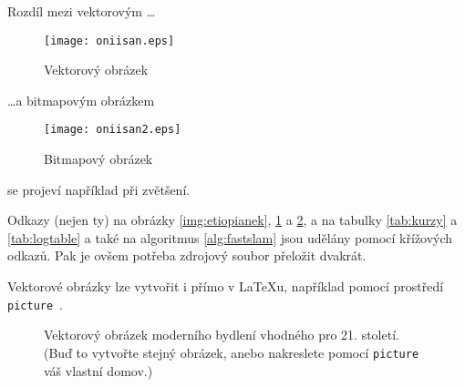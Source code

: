 \documentclass[a4paper,11pt]{article}
\newcommand*{\mojetttext}[1]{\: \texttt{#1}\ }
\begin{document}
Rozdíl mezi vektorovým \dots
\begin{figure}[!ht]
    \centering
    \texttt{[image: oniisan.eps]}
    \caption{Vektorový obrázek}
    \label{img:vector}
\end{figure}

\noindent \dots a bitmapovým obrázkem

\begin{figure}[!ht]
    \centering
    \texttt{[image: oniisan2.eps]}
    \caption{Bitmapový obrázek}
    \label{img:bitmap}
\end{figure}
\noindent se projeví například při zvětšení.

Odkazy (nejen ty) na obrázky \ref{img:etiopianek}, \ref{img:vector} a \ref{img:bitmap}, a na tabulky \ref{tab:kurzy} a \ref{tab:logtable} a také na algoritmus \ref{alg:fastslam} jsou udělány pomocí křížových odkazů.
Pak je ovšem potřeba zdrojový soubor přeložit dvakrát.

Vektorové obrázky lze vytvořit i přímo v \LaTeX u, například pomocí prostředí \mojetttext{picture}.

\begin{landscape}
\begin{figure}[p]
    \centering
    \caption{Vektorový obrázek moderního bydlení vhodného pro 21. století. (Buď to vytvořte stejný obrázek, anebo nakreslete pomocí \mojetttext{picture} váš vlastní domov.)}
    \label{img:domov}
\end{figure}
\end{landscape}
\end{document}
